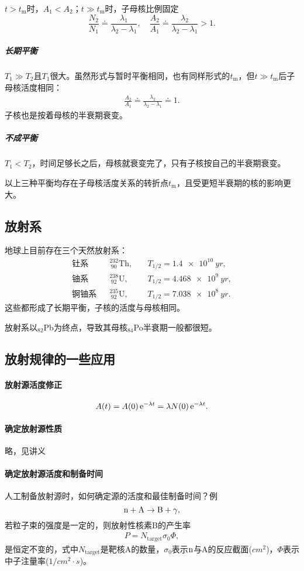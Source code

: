 $t>t_\mathrm m$时，$A_1<A_2$；$t\gg t_\mathrm m$时，子母核比例固定
\[
	\frac{N_2}{N_1}\doteq\frac{\lambda_1}{\lambda_2-\lambda_1},\quad\frac{A_2}{A_1}\doteq\frac{\lambda_2}{\lambda_2-\lambda_1}>1.
\]
\subparagraph{长期平衡}$T_1\gg T_2$且$T_1$很大。虽然形式与暂时平衡相同，也有同样形式的$t_\mathrm m$，但$t\gg t_\mathrm m$后子母核活度相同：
\begin{align}
	\frac{A_2}{A_1}\doteq\frac{\lambda_2}{\lambda_2-\lambda_1}\doteq 1.
\end{align}
子核也是按着母核的半衰期衰变。

\subparagraph{不成平衡}$T_1<T_2$，时间足够长之后，母核就衰变完了，只有子核按自己的半衰期衰变。

以上三种平衡均存在子母核活度关系的转折点$t_\mathrm m$，且受更短半衰期的核的影响更大。
\subsection{放射系}
地球上目前存在三个天然放射系：
\begin{align*}
	\text{钍系}&&^{232}_{~90}\mathrm{Th},&\quad T_{1/2}=\SI{1.4e10}{yr},\\
	\text{铀系}&&^{238}_{~92}\mathrm{U},&\quad T_{1/2}=\SI{4.468e9}{yr},\\
	\text{锕铀系}&&^{235}_{~92}\mathrm{U},&\quad T_{1/2}=\SI{7.038e8}{yr}.
\end{align*}
这些都形成了长期平衡，子核的活度与母核相同。

放射系以$_{82}$Pb为终点，导致其母核$_{84}$Po半衰期一般都很短。
\subsection{放射规律的一些应用}
\paragraph{放射源活度修正}
\[
	A(t)=A(0)\mathop{}\!\mathrm{e}^{-\lambda t}=\lambda N(0)\mathop{}\!\mathrm{e}^{-\lambda t}.
\]
\paragraph{确定放射源性质}略，见讲义
\paragraph{确定放射源活度和制备时间}人工制备放射源时，如何确定源的活度和最佳制备时间？例
\[
	\mathrm n+\mathrm{A}\to\mathrm{B}+\gamma,
\]
若粒子束的强度是一定的，则放射性核素B的产生率
\begin{align}
	P=N_{\mathrm{target}}\sigma_0\Phi,
\end{align}
是恒定不变的，式中$N_{\mathrm{target}}$是靶核A的数量，$\sigma_0$表示$\mathrm n$与A的反应截面($\si{cm^2}$)，$\Phi$表示中子注量率($\si{1/cm^2\cdot s}$)。

